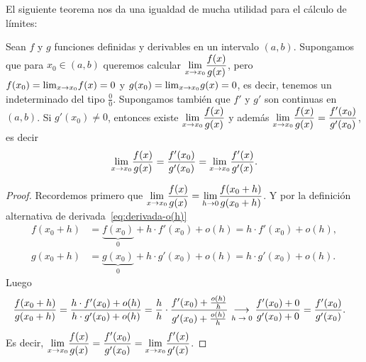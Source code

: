 El siguiente teorema nos da una igualdad de mucha utilidad para el cálculo de límites:

\begin{proposition}
    Sean $f$ y $g$ funciones definidas y derivables en un intervalo $(a,b)$.
    Supongamos que para $x_0\in(a,b)$ queremos calcular $\displaystyle{\ensuremath{\lim_{x\to x_0}}} \frac{f(x)}{g(x)}$, pero $f(x_0)={\lim_{x\to x_0}} f(x)=0$ y $g(x_0)={\lim_{x\to x_0}} g(x)=0$, es decir, tenemos un indeterminado del tipo $\frac00$.
    Supongamos también que $f'$ y $g'$ son continuas en $(a,b)$.
    Si $g'(x_0)\neq 0$, entonces existe $\displaystyle{\ensuremath{\lim_{x\to x_0}}} \frac{f(x)}{g(x)}$ y además $\displaystyle{\ensuremath{\lim_{x\to x_0}}} \frac{f(x)}{g(x)}=\frac{f'(x_0)}{g'(x_0)}$, es decir
    \[
        {\lim_{x\to x_0}} \frac{f(x)}{g(x)}=\frac{f'(x_0)}{g'(x_0)}={\lim_{x\to x_0}} \frac{f'(x)}{g'(x)}.
    \]
\end{proposition}

\begin{proof}
    Recordemos primero que $\displaystyle{\ensuremath{\lim_{x\to x_0}}} \frac{f(x)}{g(x)}={\lim_{h\to 0}} \frac{f(x_0+h)}{g(x_0+h)}$. Y por la definición alternativa de derivada~\eqref{eq:derivada-o(h)}
    \begin{align*}
        f(x_0+h) &= \underbrace{f(x_0)}_{0} + h \cdot f'(x_0) + o(h) = h \cdot f'(x_0) + o(h),\\
        g(x_0+h) &= \underbrace{g(x_0)}_{0} + h \cdot g'(x_0) + o(h) = h \cdot g'(x_0) + o(h).
    \end{align*}
    Luego
    \begin{align*}
        \frac{f(x_0+h)}{g(x_0+h)} &= \frac{ h \cdot f'(x_0) + o(h)}{h \cdot g'(x_0) + o(h)}
        = \frac hh  \cdot \frac{ f'(x_0) + \frac{o(h)}h}{ g'(x_0) + \frac{o(h)}h}
        \toh{0} \frac{f'(x_0) + 0}{g'(x_0) + 0}
        = \frac{  f'(x_0)}{ g'(x_0)}.
    \end{align*}
    Es decir, $\displaystyle{\ensuremath{\lim_{x\to x_0}}} \frac{f(x)}{g(x)}=\frac{f'(x_0)}{g'(x_0)}={\lim_{x\to x_0}} \frac{f'(x)}{g'(x)}$.
\end{proof}
    
